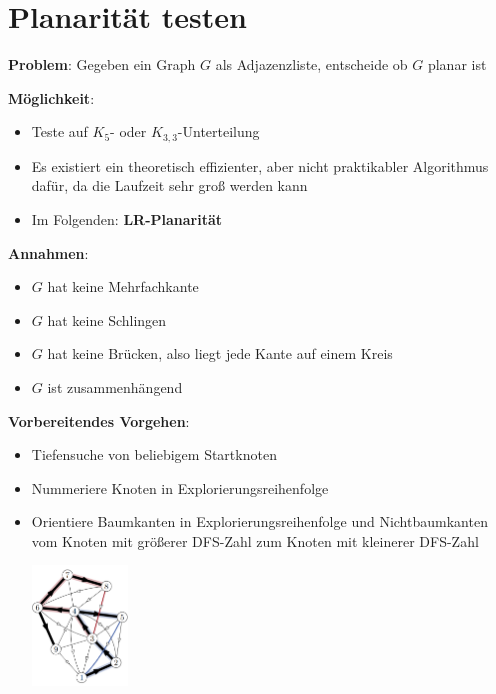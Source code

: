 \section{Planarität testen}

\textbf{Problem}: Gegeben ein Graph $G$ als Adjazenzliste, entscheide ob $G$ planar ist

\textbf{Möglichkeit}: 
\begin{itemize}
	\item Teste auf $K_5$- oder $K_{3,3}$-Unterteilung
	\item Es existiert ein theoretisch effizienter, aber nicht praktikabler Algorithmus dafür, da die Laufzeit sehr groß werden kann
	\item Im Folgenden: \textbf{LR-Planarität}
\end{itemize}

\textbf{Annahmen}:
\begin{itemize}
	\item $G$ hat keine Mehrfachkante
	\item $G$ hat keine Schlingen
	\item $G$ hat keine Brücken, also liegt jede Kante auf einem Kreis
	\item $G$ ist zusammenhängend
\end{itemize}

\textbf{Vorbereitendes Vorgehen}:
\begin{itemize}
	\item Tiefensuche von beliebigem Startknoten
	\item Nummeriere Knoten in Explorierungsreihenfolge
	\item Orientiere Baumkanten in Explorierungsreihenfolge und Nichtbaumkanten vom Knoten mit größerer DFS-Zahl zum Knoten mit kleinerer DFS-Zahl
	\begin{center}
		\includegraphics[width=0.2\textwidth]{images/dfs.png}
	\end{center}
\end{itemize}


